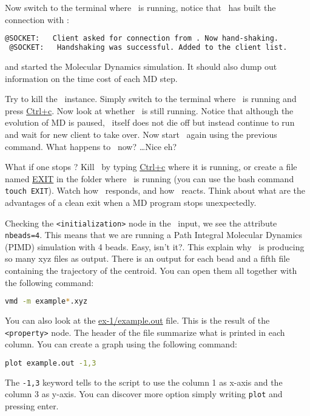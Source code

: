 \documentclass{article}
\begin{document}
\begin{Exercise}[label={i-pi},title={Molecular Dynamics: a client/server approach}]
\Question 
Now switch to the terminal where \ipi\ is running, notice
that \ipi\ has built the connection with \pwx:
\begin{lstlisting}[language=sh]
 @SOCKET:   Client asked for connection from . Now hand-shaking.
 @SOCKET:   Handshaking was successful. Added to the client list.
\end{lstlisting}
and started the Molecular Dynamics simulation.
It should also dump out information on the time cost of each MD step.

\Question
Try to kill the \pwx\ instance.  Simply switch to the
terminal where \pwx\ is running and press \url{Ctrl+c}.  Now look at
whether \ipi\ is still running.  Notice that although the evolution of
MD is paused, \ipi\ itself does not die off but instead continue to
run and wait for new client to take over.  Now start \pwx\ again using
the previous command.
What happens to \ipi\ now?  \ldots Nice eh? 


\Question 
What if one stops \ipi ?  Kill \ipi\ by typing \url{Ctrl+c}
where it is running, or create a file named \url{EXIT} in the folder
where \ipi\ is running (you can use the bash command \texttt{touch
  EXIT}).  Watch how \ipi\ responds, and how \pwx\ reacts.  Think
about what are the advantages of a clean exit when a MD program stops
unexpectedly.


\Question
Checking the \texttt{<initialization>} node in the \ipi\ input, we see
the attribute \texttt{nbeads=4}. This means that we are running a Path
Integral Molecular Dynamics (PIMD) simulation with 4 beads. Easy, isn't it?. 
This explain why \ipi\ is producing so many xyz files as output. There
is an output for each bead and a fifth file containing the trajectory
of the centroid. You can open them all together with the following
command:
\begin{lstlisting}[language=bash]
vmd -m example*.xyz
\end{lstlisting}
You can also look at the \url{ex-1/example.out} file. This is the
result of the \texttt{<property>} node. The header of the file
summarize what is printed in each column. You can create a graph using
the following command:
\begin{lstlisting}[language=bash]
plot example.out -1,3
\end{lstlisting}
The \texttt{-1,3} keyword tells to the script to use the column 1 as
x-axis and the column 3 as y-axis. You can discover more option simply
writing \texttt{plot} and pressing enter.
\end{Exercise}
\vspace{1em}
\end{document}
